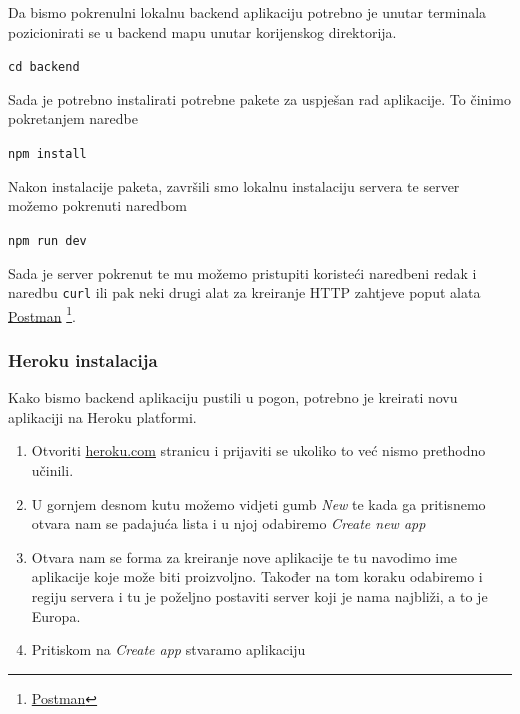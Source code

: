 	          		Da bismo pokrenulni lokalnu backend aplikaciju potrebno je unutar terminala pozicionirati se u backend mapu unutar korijenskog direktorija. 
	            
								\begin{center}
										\texttt{cd backend}
								\end{center}
								
								Sada je potrebno instalirati potrebne pakete za uspješan rad aplikacije. To činimo pokretanjem naredbe
								
								\begin{center}
										\texttt{npm install}
								\end{center}
								
								Nakon instalacije paketa, završili smo lokalnu instalaciju servera te server možemo pokrenuti naredbom
								
								\begin{center}
										\texttt{npm run dev}
								\end{center}
								
								Sada je server pokrenut te mu možemo pristupiti koristeći naredbeni redak i naredbu \texttt{curl} ili pak neki drugi alat za kreiranje HTTP zahtjeve poput alata \underline{Postman} \footnote{\href{https://www.postman.com/}{Postman}}.
		             
						\pagebreak
		    
						\subsubsection*{Heroku instalacija}
	        
								Kako bismo backend aplikaciju pustili u pogon, potrebno je kreirati novu aplikaciji na Heroku platformi.
								
								\begin{enumerate}
									\item Otvoriti \href{https://dashboard.heroku.com/apps}{heroku.com} stranicu i prijaviti se ukoliko to već nismo prethodno učinili.
									\item U gornjem desnom kutu možemo vidjeti gumb \textit{New} te kada ga pritisnemo otvara nam se padajuća lista i u njoj odabiremo \textit{Create new app}
									\item Otvara nam se forma za kreiranje nove aplikacije te tu navodimo ime aplikacije koje može biti proizvoljno. Također na tom koraku odabiremo i regiju servera i tu je poželjno postaviti server koji je nama najbliži, a to je Europa.
									\item Pritiskom na \textit{Create app} stvaramo aplikaciju
		        		\end{enumerate}
		        
